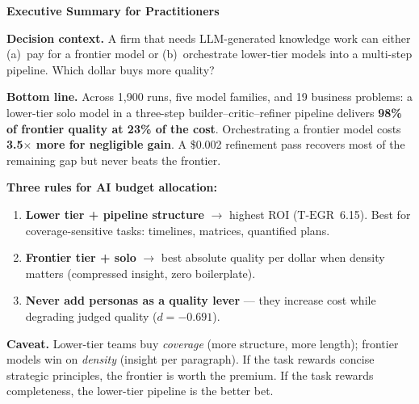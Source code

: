 \documentclass[12pt,a4paper]{article}
\newcommand{\TEGR}{\ensuremath{\text{T-EGR}}}
\begin{document}
\begin{mdframed}[style=execsummary]
\textbf{Executive Summary for Practitioners}

\medskip
\noindent\textbf{Decision context.} A firm that needs LLM-generated knowledge
work can either (a)~pay for a frontier model or (b)~orchestrate lower-tier models
into a multi-step pipeline. Which dollar buys more quality?

\medskip
\noindent\textbf{Bottom line.} Across 1{,}900 runs, five model families, and 19
business problems: a lower-tier solo model in a three-step builder--critic--refiner
pipeline delivers \textbf{98\% of frontier quality at 23\% of the cost}.
Orchestrating a frontier model costs \textbf{3.5$\times$ more for negligible
gain}. A \$0.002 refinement pass recovers most of the remaining gap but never
beats the frontier.

\medskip
\noindent\textbf{Three rules for AI budget allocation:}
\begin{enumerate}[leftmargin=*,nosep]
  \item \textbf{Lower tier + pipeline structure} $\to$ highest ROI
    ($\TEGR$~6.15). Best for coverage-sensitive tasks: timelines, matrices,
    quantified plans.
  \item \textbf{Frontier tier + solo} $\to$ best absolute quality per dollar
    when density matters (compressed insight, zero boilerplate).
  \item \textbf{Never add personas as a quality lever} --- they increase cost
    while degrading judged quality ($d = -0.691$).
\end{enumerate}

\medskip
\noindent\textbf{Caveat.} Lower-tier teams buy \emph{coverage} (more structure, more
length); frontier models win on \emph{density} (insight per paragraph). If the
task rewards concise strategic principles, the frontier is worth the premium.
If the task rewards completeness, the lower-tier pipeline is the better bet.
\end{mdframed}

\end{document}

